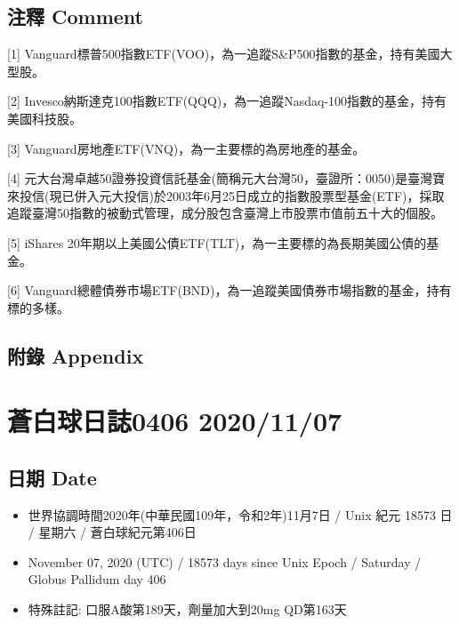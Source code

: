 \documentclass[
]{article}
\providecommand{\tightlist}{%
  \setlength{\itemsep}{0pt}\setlength{\parskip}{0pt}}
\begin{document}
\hypertarget{ux6ce8ux91cb-comment-4}{%
\subsection{注釋 Comment}\label{ux6ce8ux91cb-comment-4}}

{[}1{]}
Vanguard標普500指數ETF(VOO)，為一追蹤S\&P500指數的基金，持有美國大型股。

{[}2{]}
Invesco納斯達克100指數ETF(QQQ)，為一追蹤Nasdaq-100指數的基金，持有美國科技股。

{[}3{]} Vanguard房地產ETF(VNQ)，為一主要標的為房地產的基金。

{[}4{]}
元大台灣卓越50證券投資信託基金(簡稱元大台灣50，臺證所：0050)是臺灣寶來投信(現已併入元大投信)於2003年6月25日成立的指數股票型基金(ETF)，採取追蹤臺灣50指數的被動式管理，成分股包含臺灣上市股票市值前五十大的個股。

{[}5{]} iShares
20年期以上美國公債ETF(TLT)，為一主要標的為長期美國公債的基金。

{[}6{]}
Vanguard總體債券市場ETF(BND)，為一追蹤美國債券市場指數的基金，持有標的多樣。

\hypertarget{ux9644ux9304-appendix-4}{%
\subsection{附錄 Appendix}\label{ux9644ux9304-appendix-4}}

\hypertarget{ux84bcux767dux7403ux65e5ux8a8c0406-20201107}{%
\section{蒼白球日誌0406
2020/11/07}\label{ux84bcux767dux7403ux65e5ux8a8c0406-20201107}}

\hypertarget{ux65e5ux671f-date-5}{%
\subsection{日期 Date}\label{ux65e5ux671f-date-5}}

\begin{itemize}
\tightlist
\item
  世界協調時間2020年(中華民國109年，令和2年)11月7日 / Unix 紀元 18573 日
  / 星期六 / 蒼白球紀元第406日
\item
  November 07, 2020 (UTC) / 18573 days since Unix Epoch / Saturday /
  Globus Pallidum day 406
\item
  特殊註記: 口服A酸第189天，劑量加大到20mg QD第163天
\end{itemize}
\end{document}
